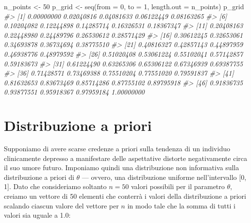 \documentclass[
]{memoir}
\newenvironment{Shaded}{\begin{snugshade}}{\end{snugshade}}
\newcommand{\AttributeTok}[1]{\textcolor[rgb]{0.77,0.63,0.00}{#1}}
\newcommand{\CommentTok}[1]{\textcolor[rgb]{0.56,0.35,0.01}{\textit{#1}}}
\newcommand{\DecValTok}[1]{\textcolor[rgb]{0.00,0.00,0.81}{#1}}
\newcommand{\FunctionTok}[1]{\textcolor[rgb]{0.00,0.00,0.00}{#1}}
\newcommand{\NormalTok}[1]{#1}
\newcommand{\OtherTok}[1]{\textcolor[rgb]{0.56,0.35,0.01}{#1}}
\begin{document}
\begin{Shaded}
\begin{Highlighting}[]
\NormalTok{n\_points }\OtherTok{\textless{}{-}} \DecValTok{50}
\NormalTok{p\_grid }\OtherTok{\textless{}{-}} \FunctionTok{seq}\NormalTok{(}\AttributeTok{from =} \DecValTok{0}\NormalTok{, }\AttributeTok{to =} \DecValTok{1}\NormalTok{, }\AttributeTok{length.out =}\NormalTok{ n\_points)}
\NormalTok{p\_grid}
\CommentTok{\#\textgreater{}  [1] 0.00000000 0.02040816 0.04081633 0.06122449 0.08163265}
\CommentTok{\#\textgreater{}  [6] 0.10204082 0.12244898 0.14285714 0.16326531 0.18367347}
\CommentTok{\#\textgreater{} [11] 0.20408163 0.22448980 0.24489796 0.26530612 0.28571429}
\CommentTok{\#\textgreater{} [16] 0.30612245 0.32653061 0.34693878 0.36734694 0.38775510}
\CommentTok{\#\textgreater{} [21] 0.40816327 0.42857143 0.44897959 0.46938776 0.48979592}
\CommentTok{\#\textgreater{} [26] 0.51020408 0.53061224 0.55102041 0.57142857 0.59183673}
\CommentTok{\#\textgreater{} [31] 0.61224490 0.63265306 0.65306122 0.67346939 0.69387755}
\CommentTok{\#\textgreater{} [36] 0.71428571 0.73469388 0.75510204 0.77551020 0.79591837}
\CommentTok{\#\textgreater{} [41] 0.81632653 0.83673469 0.85714286 0.87755102 0.89795918}
\CommentTok{\#\textgreater{} [46] 0.91836735 0.93877551 0.95918367 0.97959184 1.00000000}
\end{Highlighting}
\end{Shaded}

\hypertarget{distribuzione-a-priori-1}{%
\section{Distribuzione a priori}\label{distribuzione-a-priori-1}}

Supponiamo di avere scarse credenze a priori sulla tendenza di un individuo clinicamente depresso a manifestare delle aspettative distorte negativamente circa il suo umore futuro. Imponiamo quindi una distribuzione non informativa sulla distribuzione a priori di \(\theta\) --- ovvero, una distribuzione uniforme nell'intervallo {[}0, 1{]}. Dato che consideriamo soltanto \(n = 50\) valori possibili per il parametro \(\theta\), creiamo un vettore di 50 elementi che conterrà i valori della distribuzione a priori scalando ciascun valore del vettore per \(n\) in modo tale che la somma di tutti i valori sia uguale a 1.0:
\end{document}
